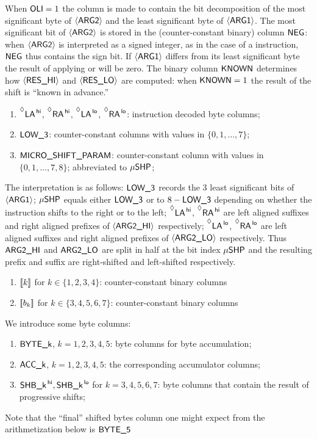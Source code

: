 When $\textsf{OLI} = 1$ the \someBits{} column is made to contain the bit decomposition of the most significant byte of $\langle{}\textsf{ARG}\textsf{2}\rangle{}$ and the least significant byte of $\langle{}\textsf{ARG}\textsf{1}\rangle{}$. The most significant bit of $\langle{}\textsf{ARG}\textsf{2}\rangle{}$ is stored in the (counter-constant binary) column $\textsf{NEG}$: when $\langle{}\textsf{ARG}\textsf{2}\rangle{}$ is interpreted as a signed integer, as in the case of a  instruction, $\textsf{NEG}$ thus contains the sign bit. If $\langle{}\textsf{ARG}\textsf{1}\rangle{}$ differs from its least significant byte the result of applying  or  will be zero. The binary column $\textsf{KNOWN}$ determines how $\langle{}\textsf{RES}\textsf{\_HI}\rangle{}$ and $\langle{}\textsf{RES}\textsf{\_LO}\rangle{}$ are computed: when $\textsf{KNOWN} = 1$ the result of the shift is ``known in advance.''
\begin{enumerate}[resume]
	\item $\prescript{\lozenge}{}{\textsf{LA}^{\mathsf{\,hi}}}$, $\prescript{\lozenge}{}{\textsf{RA}^{\mathsf{\,hi}}}$, $\prescript{\lozenge}{}{\textsf{LA}^{\mathsf{\,lo}}}$, $\prescript{\lozenge}{}{\textsf{RA}^{\mathsf{\,lo}}}$: instruction decoded byte columns;
	\item $\textsf{LOW\_3}$: counter-constant columns with values in $\{0,1,\dots,7\}$;
	\item $\textsf{MICRO\_SHIFT\_PARAM}$: counter-constant column with values in $\{0,1,\dots,7,8\}$; abbreviated to $\textsf{$\mu$SHP}$;
\end{enumerate}
The interpretation is as follows:
$\textsf{LOW\_3}$ records the 3 least significant bits of $\langle{}\textsf{ARG}\textsf{1}\rangle{}$;
$\textsf{$\mu$SHP}$ equals either $\textsf{LOW\_3}$ or to $8 - \textsf{LOW\_3}$ depending on whether the instruction shifts to the right or to the left;
$\prescript{\lozenge}{}{\textsf{LA}^{\mathsf{\,hi}}}$, $\prescript{\lozenge}{}{\textsf{RA}^{\mathsf{\,hi}}}$ are left aligned suffixes and right aligned prefixes of $\langle{}\textsf{ARG}\textsf{2}\textsf{\_HI}\rangle{}$ respectively;
$\prescript{\lozenge}{}{\textsf{LA}^{\mathsf{\,lo}}}$, $\prescript{\lozenge}{}{\textsf{RA}^{\mathsf{\,lo}}}$ are left aligned suffixes and right aligned prefixes of $\langle{}\textsf{ARG}\textsf{2}\textsf{\_LO}\rangle{}$ respectively.
Thus $\textsf{ARG}\textsf{2}\textsf{\_HI}$ and $\textsf{ARG}\textsf{2}\textsf{\_LO}$ are split in half at the bit index $\textsf{$\mu$SHP}$ and the resulting prefix and suffix are right-shifted and left-shifted respectively.
\begin{enumerate}[resume]
	\item $[\![k]\!]$ for $k \in \{1, 2, 3, 4\}$: counter-constant binary columns
	\item $[\![b_{k}]\!]$ for $k \in \{3, 4, 5, 6, 7\}$: counter-constant binary columns
\end{enumerate}
We introduce some byte columns:
\begin{enumerate}[resume]
	\item $\textsf{BYTE}\textsf{\_k}$, $k=1,2,3,4,5$: byte columns for byte accumulation;
	\item $\textsf{ACC}\textsf{\_k}$, $k=1,2,3,4,5$: the corresponding accumulator columns;
	\item $\textsf{SHB\_k}^{\mathsf{\,hi}}, \textsf{SHB\_k}^{\mathsf{\,lo}}$ for $k=3,4,5,6,7$: byte columns that contain the result of progressive shifts;
\end{enumerate}
\noindent Note that the ``final'' shifted bytes column one might expect from the arithmetization below is $\textsf{BYTE}\textsf{\_5}$